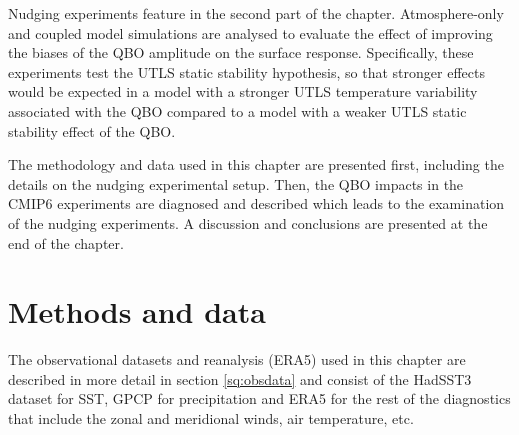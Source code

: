 Nudging experiments feature in the second part of the chapter. Atmosphere-only and coupled model simulations are analysed to evaluate the effect of improving the biases of the QBO amplitude on the surface response. Specifically, these experiments test the UTLS static stability hypothesis, so that stronger effects would be expected in a model with a stronger UTLS temperature variability associated with the QBO compared to a model with  a weaker UTLS static stability effect of the QBO. 

The methodology and data used in this chapter are presented first, including the details on the nudging experimental setup. Then, the QBO impacts in the CMIP6 experiments are diagnosed and described which leads to the examination of the nudging experiments. 
A discussion and conclusions are presented at the end of the chapter. %





\section{Methods and data}

The observational datasets and reanalysis (ERA5) used in this chapter are described in more detail in section \ref{sq:obsdata} and consist of the HadSST3 dataset for SST, GPCP for precipitation and ERA5 for the rest of the diagnostics that include the zonal and meridional winds, air temperature, etc.

